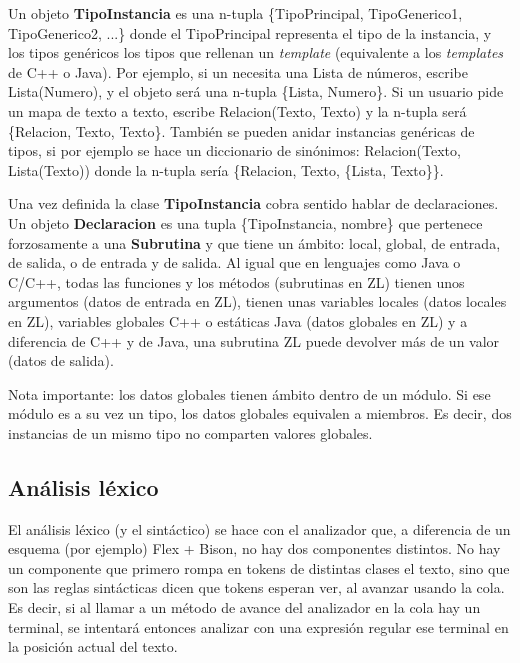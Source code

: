 \documentclass{report}
\begin{document}
	\vspace{10px}
	
	Un objeto \textbf{TipoInstancia} es una n-tupla \{TipoPrincipal, TipoGenerico1, TipoGenerico2, ...\} donde el TipoPrincipal representa el tipo de la instancia, y los tipos genéricos los tipos que rellenan un \textit{template} (equivalente a los \textit{templates} de C++ o Java). Por ejemplo, si un necesita una Lista de números, escribe Lista(Numero), y el objeto será una n-tupla \{Lista, Numero\}. Si un usuario pide un mapa de texto a texto, escribe Relacion(Texto, Texto) y la n-tupla será \{Relacion, Texto, Texto\}. También se pueden anidar instancias genéricas de tipos, si por ejemplo se hace un diccionario de sinónimos: Relacion(Texto, Lista(Texto)) donde la n-tupla sería \{Relacion, Texto, \{Lista, Texto\}\}.
	
	\vspace{10px}
	
	Una vez definida la clase \textbf{TipoInstancia} cobra sentido hablar de declaraciones. Un objeto \textbf{Declaracion} es una tupla \{TipoInstancia, nombre\} que pertenece forzosamente a una \textbf{Subrutina} y que tiene un ámbito: local, global, de entrada, de salida, o de entrada y de salida. Al igual que en lenguajes como Java o C/C++, todas las funciones y los métodos (subrutinas en ZL) tienen unos argumentos (datos de entrada en ZL), tienen unas variables locales (datos locales en ZL), variables globales C++ o estáticas Java (datos globales en ZL) y a diferencia de C++ y de Java, una subrutina ZL puede devolver más de un valor (datos de salida).
	
	\vspace{10px}
	\noindent
	Nota importante: los datos globales tienen ámbito dentro de un módulo. Si ese módulo es a su vez un tipo, los datos globales equivalen a miembros. Es decir, dos instancias de un mismo tipo no comparten valores globales. 
	
	
	\subsection{Análisis léxico}
	
	El análisis léxico (y el sintáctico) se hace con el analizador que, a diferencia de un esquema (por ejemplo) Flex + Bison, no hay dos componentes distintos. No hay un componente que primero rompa en tokens de distintas clases el texto, sino que son las reglas sintácticas dicen que tokens esperan ver, al avanzar usando la cola. Es decir, si al llamar a un método de avance del analizador en la cola hay un terminal, se intentará entonces analizar con una expresión regular ese terminal en la posición actual del texto. 
	
\end{document}
